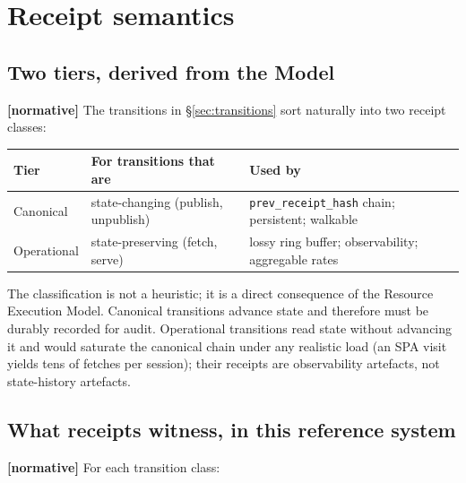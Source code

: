 \documentclass[11pt,a4paper]{article}
\newcommand{\normsv}{\textcolor{normativecolor}{\textbf{[normative]}}\xspace}
\theoremstyle{definition}
\begin{document}
\section{Receipt semantics}
\label{sec:receipts}

\subsection{Two tiers, derived from the Model}

\normsv{} The transitions in §\ref{sec:transitions} sort
naturally into two receipt classes:

\begin{center}
\renewcommand{\arraystretch}{1.18}
\begin{tabularx}{\linewidth}{l X X}
\toprule
\textbf{Tier} & \textbf{For transitions that are} & \textbf{Used by} \\
\midrule
Canonical
 & state-changing (publish, unpublish)
 & \texttt{prev\_receipt\_hash} chain; persistent; walkable \\
Operational
 & state-preserving (fetch, serve)
 & lossy ring buffer; observability; aggregable rates \\
\bottomrule
\end{tabularx}
\end{center}

The classification is not a heuristic; it is a direct
consequence of the Resource Execution Model. Canonical
transitions advance state and therefore must be durably
recorded for audit. Operational transitions read state without
advancing it and would saturate the canonical chain under any
realistic load (an SPA visit yields tens of fetches per
session); their receipts are observability artefacts, not
state-history artefacts.

\subsection{What receipts witness, in this reference system}

\normsv{} For each transition class:
\end{document}
